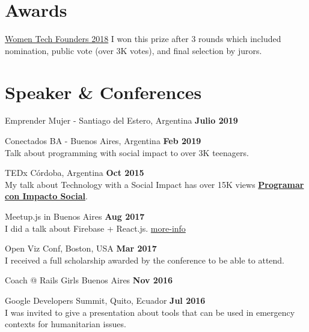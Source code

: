 \documentclass[margin,line]{resume}
\begin{document}
\begin{resume}
\section{\mysidestyle Awards}

\begin{list2}
\item \href{https://womentechfounders.com/2018-award-winners/}{Women Tech Founders 2018} I won this prize after 3 rounds which included nomination, public vote (over 3K votes), and final selection by jurors.
\end{list2}


\section{\mysidestyle Speaker \& Conferences}

\begin{list2}
\item Emprender Mujer - Santiago del Estero, Argentina \hfill \textbf{Julio 2019}  
\item Conectados BA - Buenos Aires, Argentina \hfill \textbf{Feb 2019}  \\
Talk about programming with social impact to over 3K teenagers.

\item  TEDx C\'ordoba, Argentina \hfill \textbf{Oct 2015}  \\
My talk about Technology with a Social Impact has over 15K views \href{https://www.youtube.com/watch?v=0cx8UwdN-g4&t=1s}{\textbf{Programar con Impacto Social}}.


\item Meetup.js in Buenos Aires \hfill \textbf{Aug 2017}
\\
I did a talk about Firebase + React.js. \href{https://www.meetup.com/Meetup-js/events/242439836/?eventId=242439836}{more-info}



\item Open Viz Conf, Boston, USA \hfill \textbf{Mar 2017}
\\ I received a full scholarship awarded by the conference to be able to attend.

\item Coach  @ Rails Girls Buenos Aires \hfill \textbf{Nov 2016}

\item  Google Developers Summit, Quito, Ecuador \hfill \textbf{Jul 2016}  \\
I was invited to give a presentation about tools that can be used in emergency contexts for humanitarian issues.


\end{list2}
\end{resume}
\end{document}

